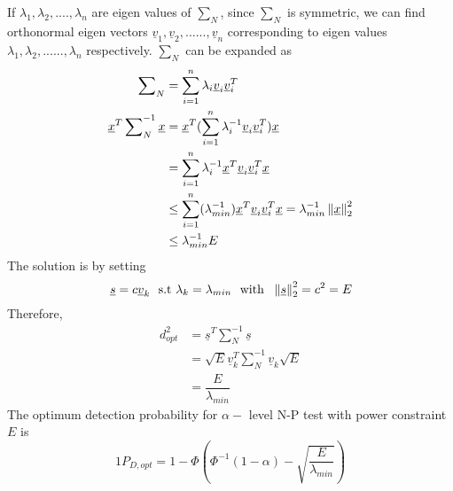 \documentclass[a4paper,english,12pt]{article}
\begin{document}
\noindent If $\lambda_1, \lambda_2, ....,\lambda_n$ are eigen values of $\sum_N$, since $\sum_N$ is symmetric, we can find orthonormal eigen vectors $\underline{v}_1, \underline{v}_2,......,\underline{v}_n$ corresponding to eigen values $\lambda_1,\lambda_2,......,\lambda_n$ respectively. $\sum_N$ can be expanded as
\begin{align*}
\sum\nolimits_N &=\sum_{i=1}^{n}\lambda_i \underline{v}_i \underline{v}_i^T \\
\underline{x}^T \sum\nolimits_N^{-1} \underline{x} &= \underline{x}^T (\sum_{i=1}^{n} \lambda_i^{-1} \underline{v}_i\underline{v}_i^T)\underline{x} \\
&=\sum_{i=1}^n \lambda_i^{-1} \underline{x}^T \underline{v}_i\underline{v}_i^T \underline{x} \\
&\leq \sum_{i=1}^n (\lambda_{min}^{-1})\underline{x}^T\underline{v}_i\underline{v}_i^T \underline{x}=\lambda_{min}^{-1} \left\lVert\underline{x}\right\rVert^2_2 \nonumber\\
&\leq \lambda_{min}^{-1}E
\end{align*}
\noindent The solution is by setting 
$$\underline{s}=c \underline{v}_k \ \ \mbox{s.t} \ \lambda_k = \lambda_{min} \ \ \mbox{with} \ \ \norm{\underline{s}}^2_2 = c^2=E $$
Therefore,
\begin{align*}
d_{opt}^2 &=\underline{s}^T \sum\nolimits_N^{-1}\underline{s}  \\
&=\sqrt{E} \underline{v}_k^T \sum\nolimits_N^{-1} \underline{v}_k \sqrt{E}\\
&= \dfrac{E}{\lambda_{min}}
\end{align*}
\noindent The optimum detection probability for $\alpha-$ level N-P test with power constraint $E$ is 
\begin{equation}
1P_{D,opt}=1-\Phi\left(\Phi^{-1}(1-\alpha) - \sqrt{\dfrac{E}{\lambda_{min}}}\right)
\end{equation}
\end{document}
